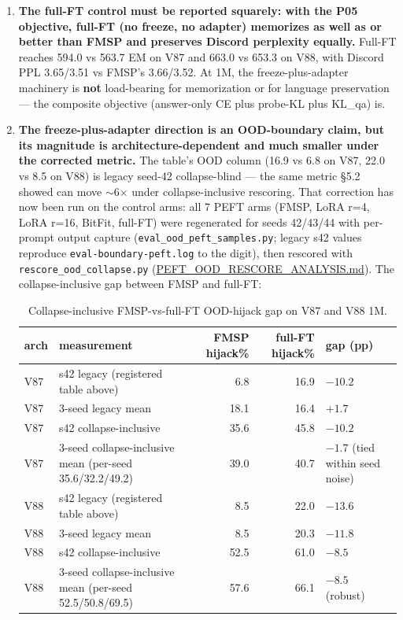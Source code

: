 \documentclass[11pt]{article}
\begin{document}
\begin{enumerate}
store the answer bytes. (Full sweep: \href{https://github.com/llaa33219/MicroMixer-4/blob/4bb630413dfa58ef3141291e121ab8c006d03235/PEFT_LORA_SWEEP_ANALYSIS.md}{PEFT\_LORA\_SWEEP\_ANALYSIS.md}; all five new arms are seed-42.)

\item \textbf{The full-FT control must be reported squarely: with the P05 objective, full-FT (no freeze, no adapter) memorizes as well as or better than FMSP and preserves Discord perplexity equally.} Full-FT reaches 594.0 vs 563.7 EM on V87 and 663.0 vs 653.3 on V88, with Discord PPL 3.65/3.51 vs FMSP's 3.66/3.52. At 1M, the freeze-plus-adapter machinery is \textbf{not} load-bearing for memorization or for language preservation --- the composite objective (answer-only CE plus probe-KL plus KL\_qa) is.

\item \textbf{The freeze-plus-adapter direction is an OOD-boundary claim, but its magnitude is architecture-dependent and much smaller under the corrected metric.} The table's OOD column (16.9 vs 6.8 on V87, 22.0 vs 8.5 on V88) is legacy seed-42 collapse-blind --- the same metric \S5.2 showed can move $\sim$6$\times$ under collapse-inclusive rescoring. That correction has now been run on the control arms: all 7 PEFT arms (FMSP, LoRA r=4, LoRA r=16, BitFit, full-FT) were regenerated for seeds 42/43/44 with per-prompt output capture (\texttt{eval\_ood\_peft\_samples.py}; legacy s42 values reproduce \texttt{eval-boundary-peft.log} to the digit), then rescored with \texttt{rescore\_ood\_collapse.py} (\href{https://github.com/llaa33219/MicroMixer-4/blob/4bb630413dfa58ef3141291e121ab8c006d03235/PEFT_OOD_RESCORE_ANALYSIS.md}{PEFT\_OOD\_RESCORE\_ANALYSIS.md}). The collapse-inclusive gap between FMSP and full-FT:

\begin{table}[!h]
\centering\small
\caption{Collapse-inclusive FMSP-vs-full-FT OOD-hijack gap on V87 and V88 1M.}
\label{tab:peft-gap}
\setlength{\tabcolsep}{4pt}
\begin{tabular}{lp{6.2cm}rr>{\raggedleft\arraybackslash}p{2.8cm}}
\toprule
arch & measurement & FMSP hijack\% & full-FT hijack\% & gap (pp) \\
\midrule
V87 & s42 legacy (registered table above) & 6.8 & 16.9 & $-10.2$ \\
V87 & 3-seed legacy mean & 18.1 & 16.4 & $+1.7$ \\
V87 & s42 collapse-inclusive & 35.6 & 45.8 & $-10.2$ \\
V87 & 3-seed collapse-inclusive mean (per-seed 35.6/32.2/49.2) & 39.0 & 40.7 & $-1.7$ (tied within seed noise) \\
V88 & s42 legacy (registered table above) & 8.5 & 22.0 & $-13.6$ \\
V88 & 3-seed legacy mean & 8.5 & 20.3 & $-11.8$ \\
V88 & s42 collapse-inclusive & 52.5 & 61.0 & $-8.5$ \\
V88 & 3-seed collapse-inclusive mean (per-seed 52.5/50.8/69.5) & 57.6 & 66.1 & $-8.5$ (robust) \\
\bottomrule
\end{tabular}
\end{table}


\end{enumerate}
\end{document}
